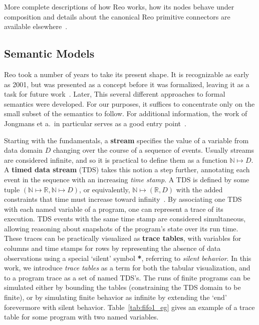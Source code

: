 More complete descriptions of how Reo works, how its nodes behave under composition and details about the canonical Reo primitive connectors are available elsewhere~\cite{arbab2004modeling, arbab2005abstract, arbab2011puff}.


\subsection{Semantic Models}
\label{sec:semantic_models}
Reo took a number of years to take its present shape. It is recognizable as early as 2001, but was presented as a concept before it was formalized, leaving it as a task for future work~\cite{jongmans2012overview}. Later, This several different approaches to formal semantics were developed. For our purposes, it suffices to concentrate only on the small subset of the semantics to follow. For additional information, the work of Jongmans et a.\ in particular serves as a good entry point~\cite{jongmans2012overview}.


Starting with the fundamentals, a \textbf{stream} specifies the value of a variable from data domain $D$ changing over the course of a sequence of events. Usually streams are considered infinite, and so it is practical to define them as a function $\mathbb{N}\mapsto{}D$. A \textbf{timed data stream} (TDS) takes this notion a step further, annotating each event in the sequence with an increasing \textit{time stamp}. A TDS is defined by some tuple $(\mathbb{N}\mapsto{}\mathbb{R}, \mathbb{N}\mapsto{}D)$, or equivalently, $\mathbb{N}\mapsto{}(\mathbb{R}, D)$ with the added constraints that time must increase toward infinity~\cite{arbab2004modeling}. By associating one TDS with each named variable of a program, one can represent a trace of its execution. TDS events with the same time stamp are considered simultaneous, allowing reasoning about snapshots of the program's state over its run time. These traces can be practically visualized as \textbf{trace tables}, with variables for columns and time stamps for rows by representing the absence of data observations using a special `silent' symbol \textbf{*}, referring to \textit{silent behavior}. In this work, we introduce \textit{trace tables} as a term for both the tabular visualization, and to a program trace as a set of named TDS's. The runs of finite programs can be simulated either by bounding the tables (constraining the TDS domain to be finite), or by simulating finite behavior as infinite by extending the `end' forevermore with silent behavior. Table~\ref{tab:fifo1_eg} gives an example of a trace table for some program with two named variables.


